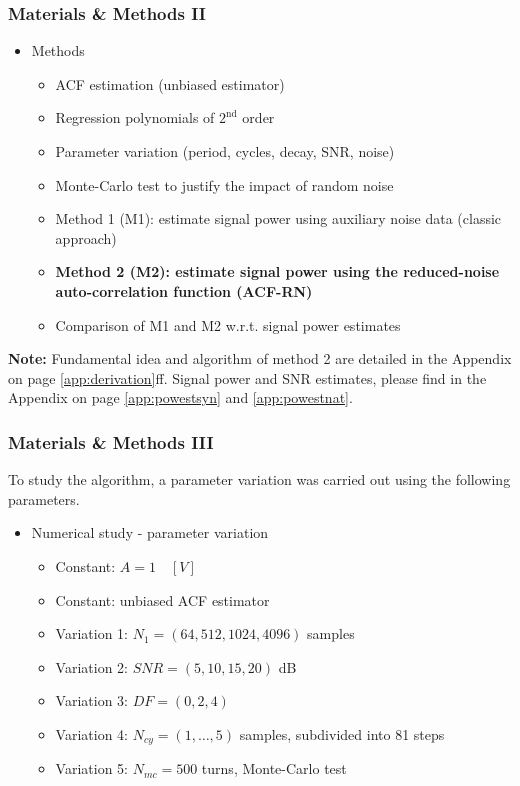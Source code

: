 \documentclass[11pt,aspectratio=169]{beamer}
\begin{document}
	\begin{frame}
		\frametitle{Materials \& Methods II}
		\begin{itemize}
			\setlength\itemsep{0.5em}
			\item \textcolor{RIPtitlecol}{Methods}
			\begin{itemize}
				\setlength\itemsep{0.5em}
				\item ACF estimation (unbiased estimator)
				\item Regression polynomials of $2^{\text{nd}}$ order
				\item Parameter variation (period, cycles, decay, SNR, noise)
				\item Monte-Carlo test to justify the impact of random noise
				\item Method 1 (M1): estimate signal power using auxiliary noise data (classic approach)
				\item \textbf{Method 2 (M2): estimate signal power using the reduced-noise auto-correlation function (ACF-RN)}
				\item Comparison of M1 and M2 w.r.t. signal power estimates
			\end{itemize}
		\end{itemize}
		\vspace*{.5em}
		\small \textbf{Note:} Fundamental idea and algorithm of method 2 are detailed in the Appendix on page \ref{app:derivation}ff. Signal power and SNR estimates, please find in the Appendix on page \ref{app:powestsyn} and \ref{app:powestnat}.
	\end{frame}
	\begin{frame}
		\frametitle{Materials \& Methods III}
		To study the algorithm, a parameter variation was carried out using the following parameters.
		\begin{itemize}
			\setlength\itemsep{0.5em}
			\item \textcolor{RIPtitlecol}{Numerical study - parameter variation}
			\begin{itemize}
				\setlength\itemsep{0.5em}
				\item Constant: $A = 1 \quad [V]$
				\item Constant: unbiased ACF estimator
				\item Variation 1: $N_1 = (64, 512, 1024, 4096)$ samples
				\item Variation 2: $SNR = (5, 10, 15, 20)$ dB
				\item Variation 3: $DF = (0, 2, 4)$
				\item Variation 4: $N_{cy} = (1,\ldots,5)$ samples, subdivided into 81 steps
				\item Variation 5: $N_{mc} = 500$ turns, Monte-Carlo test
			\end{itemize}
		\end{itemize}
	\end{frame}
\end{document}
